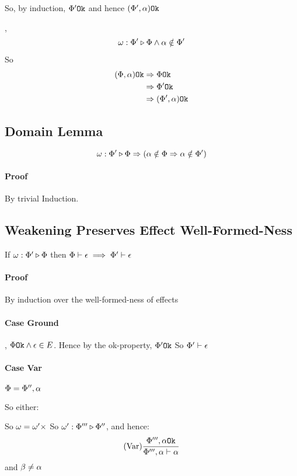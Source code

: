 {    So, by induction, $\Phi' \texttt{Ok}$ and hence $(\Phi', \alpha) \texttt{Ok}$

    \subcase{$\w\x$}
    \bi, 
    \begin{equation}
        \omega : \Phi' \triangleright \Phi \wedge \alpha\notin\Phi'
    \end{equation}

    So
    \begin{align}
        (\Phi, \alpha) \texttt{Ok} & \Rightarrow \Phi \texttt{Ok} \\
        & \Rightarrow \Phi' \texttt{Ok}\\
        & \Rightarrow (\Phi', \alpha) \texttt{Ok}\\
    \end{align}
    \subsection{Domain Lemma}

    $$\omega : \Phi' \triangleright \Phi \Rightarrow (\alpha\notin\Phi \Rightarrow \alpha\notin\Phi')$$

    \paragraph{Proof}
    By trivial Induction.
   
    \subsection{Weakening Preserves Effect Well-Formed-Ness}
    If $\omega : \Phi' \triangleright \Phi$ then $\Phi\vdash \epsilon\implies\Phi'\vdash \epsilon$

    \paragraph{Proof}
    By induction over the well-formed-ness of effects
    \paragraph{Case Ground}
    \bi, $\Phi \texttt{Ok}\wedge\epsilon\in E$.
    Hence by the ok-property, $\Phi' \texttt{Ok}$
    So $\Phi'\vdash \epsilon$

    \paragraph{Case Var}

    $\Phi = \Phi'', \alpha$

    So either:

        So $\omega = \omega'\times$
        So $\omega' : \Phi''' \triangleright \Phi''$, and hence:
        \begin{equation}
            (\text{Var}) \frac{\Phi''', \alpha \texttt{Ok}}{\Phi''',\alpha\vdash \alpha}
        \end{equation}
     and $\beta \neq\alpha$

}

